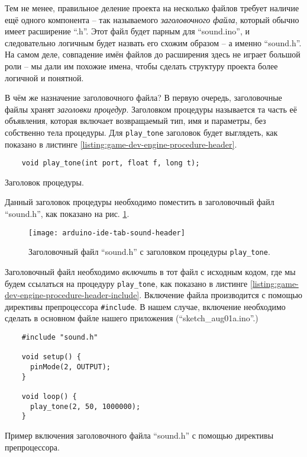 \documentclass[../sparc.tex]{subfiles}
\begin{document}
Тем не менее, правильное деление проекта на несколько файлов требует наличие ещё
одного компонента -- так называемого \emph{заголовочного файла}, который обычно
имеет расширение ``.h''.  Этот файл будет парным для ``sound.ino'', и
следовательно логичным будет назвать его схожим образом -- а именно ``sound.h''.
На самом деле, совпадение имён файлов до расширения здесь не играет большой роли
-- мы дали им похожие имена, чтобы сделать структуру проекта более логичной и
понятной.

В чём же назначение заголовочного файла?  В первую очередь, заголовочные файлы
хранят \emph{заголовки процедур}.  Заголовком процедуры называется та часть её
объявления, которая включает возвращаемый тип, имя и параметры, без собственно
тела процедуры.  Для \texttt{play_tone} заголовок будет выглядеть, как
показано в листинге \ref{listing:game-dev-engine-procedure-header}.

\begin{listing}[H]
  \begin{verbatim}
    void play_tone(int port, float f, long t);
  \end{verbatim}
  \label{listing:game-dev-engine-procedure-header}
  \caption{Заголовок процедуры.}
\end{listing}

Данный заголовок процедуры необходимо поместить в заголовочный файл ``sound.h'',
как показано на рис. \ref{fig:arduino-ide-tab-sound-header}.

\begin{figure}[ht]
  \centering
  \texttt{[image: arduino-ide-tab-sound-header]}
  \caption{Заголовочный файл ``sound.h'' с заголовком процедуры
    \texttt{play_tone}.}
  \label{fig:arduino-ide-tab-sound-header}
\end{figure}

Заголовочный файл необходимо \emph{включить} в тот файл с исходным кодом, где мы
будем ссылаться на процедуру \texttt{play_tone}, как показано в
листинге \ref{listing:game-dev-engine-procedure-header-include}.  Включение
файла производится с помощью директивы препроцессора \texttt{#include}.
В нашем случае, включение необходимо сделать в основном файле нашего приложения
(``sketch\_aug01a.ino''.)

\begin{listing}[H]
  \begin{verbatim}
    #include "sound.h"

    void setup() {
      pinMode(2, OUTPUT);
    }

    void loop() {
      play_tone(2, 50, 1000000);
    }
  \end{verbatim}
  \label{listing:game-dev-engine-procedure-header-include}
  \caption{Пример включения заголовочного файла ``sound.h'' с помощью директивы
    препроцессора.}
\end{listing}
\end{document}
